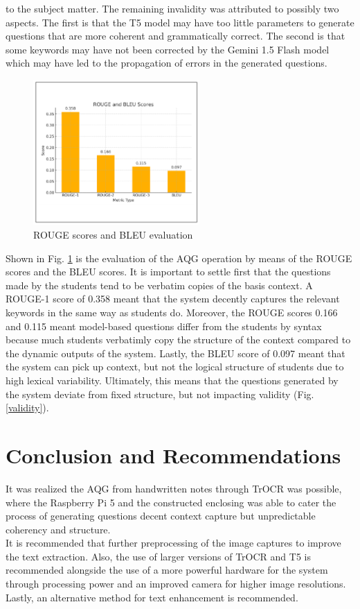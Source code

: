 \documentclass[conference]{IEEEtran}
\begin{document}
to the subject matter. The remaining invalidity was attributed to 
possibly two aspects. The first is that the T5 model may have too little 
parameters to generate questions that are more coherent and 
grammatically correct. The second is that some keywords may have not been 
corrected by the Gemini 1.5 Flash model which may have led to the
propagation of errors in the generated questions.
\newpage
\begin{figure}[H]
    \centerline{\includegraphics[width=2.5in]{eval.png}}
    \vspace{-0.3cm}
    \caption{ROUGE scores and BLEU evaluation} 
    \label{eval}
\end{figure}
\vspace{-0.3cm}
Shown in Fig. \ref{eval} is the evaluation of the AQG operation by means
of the ROUGE scores and the BLEU scores. 
It is important to settle first that the questions made by the 
students tend to be verbatim copies of the basis context. 
A ROUGE-1 score of 0.358 meant that the system decently captures 
the relevant keywords in the same way as students do. 
Moreover, the ROUGE scores 0.166
and 0.115 meant model-based questions differ from the 
students by syntax
because much students verbatimly copy 
the structure of the context compared to the dynamic outputs 
of the system. Lastly, the BLEU score of 0.097 meant that 
the system can pick up context, but not the logical structure 
of students due to high lexical variability. Ultimately, this means 
that the questions generated by the system deviate from fixed structure, 
but not impacting validity (Fig. \ref{validity}).

\section{Conclusion and Recommendations}
\indent It was realized the AQG from handwritten notes 
through TrOCR was possible, where the Raspberry Pi 5 
and the constructed enclosing
was able to cater the process of generating
questions decent context capture but unpredictable coherency and 
structure. \\
\indent It is recommended that further preprocessing of the image 
captures to improve the text extraction. Also, 
the use of larger versions of TrOCR and T5 is recommended 
alongside the use of a more powerful hardware for the system
through processing power and an improved camera for 
higher image resolutions. Lastly, an alternative method 
for text enhancement is recommended.




\end{document}
